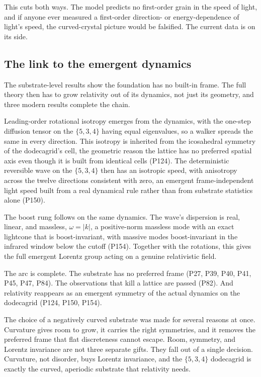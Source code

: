 This cuts both ways. The model predicts no first-order grain in the
speed of light, and if anyone ever measured a first-order direction- or energy-dependence of light's speed,
the curved-crystal picture would be falsified. The current data is on its side.

\subsection{The link to the emergent dynamics}

The substrate-level results show the foundation has no built-in frame. The full theory then has to grow
relativity out of its dynamics, not just its geometry, and three modern results complete the chain.

Leading-order rotational isotropy emerges from the dynamics, with the one-step diffusion tensor on the $\{5,3,4\}$
having equal eigenvalues, so a walker spreads the same in every direction. This isotropy is inherited from
the icosahedral symmetry of the dodecagrid's cell, the geometric reason the lattice has no preferred spatial
axis even though it is built from identical cells (P124). The deterministic reversible wave on the
$\{5,3,4\}$ then has an isotropic speed, with anisotropy across the twelve directions consistent with zero, an
emergent frame-independent light speed built from a real dynamical rule rather than from substrate statistics
alone (P150).

The boost rung follows on the same dynamics. The wave's dispersion is real, linear, and
massless, $\omega = |k|$, a positive-norm massless mode with an exact lightcone that is boost-invariant, with
massive modes boost-invariant in the infrared window below the cutoff (P154). Together with the rotations,
this gives the full emergent Lorentz group acting on a genuine relativistic field.

The arc is complete. The substrate has no preferred frame (P27, P39, P40, P41, P45, P47, P84). The
observations that kill a lattice are passed (P82). And relativity reappears as an emergent symmetry of the
actual dynamics on the dodecagrid (P124, P150, P154).

The choice of a negatively curved substrate was made
for several reasons at once. Curvature gives room to grow, it carries the right symmetries, and it removes
the preferred frame that flat discreteness cannot escape. Room, symmetry, and Lorentz invariance are not
three separate gifts. They fall out of a single decision. Curvature, not disorder, buys Lorentz invariance,
and the $\{5,3,4\}$ dodecagrid is exactly the curved, aperiodic substrate that relativity needs.
